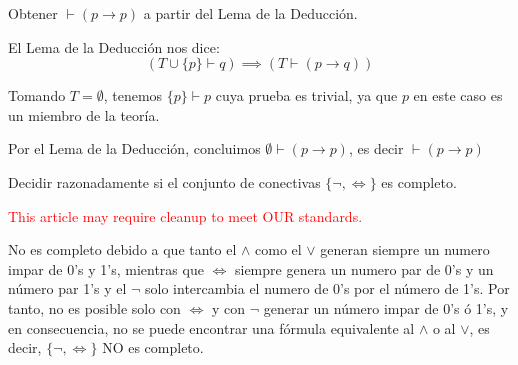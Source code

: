 \begin{problem}[9]
Obtener $\vdash (p\to p)$ a partir del Lema de la Deducci\'on.
\solution


El Lema de la Deducción nos dice: \[(T \cup \{p\} \vdash q) \implies (T\vdash (p\to q))\]

Tomando $T=\emptyset$, tenemos $\{p\} \vdash p$ cuya prueba es trivial, ya que $p$ en este caso es un miembro de la teoría.

Por el Lema de la Deducción, concluimos $\emptyset \vdash (p\to p)$, es decir $\vdash (p\to p)$


\end{problem}

\begin{problem}[10]
Decidir razonadamente si el conjunto de conectivas $\{¬,\iff\}$ es completo.
\label{ejer::H3P10}
\solution

\textcolor{red}{This article may require cleanup to meet OUR standards.}

No es completo debido a que tanto el $\land$ como el $\lor$ generan siempre un numero impar de 0's y 1's, mientras que $\iff$ siempre genera un numero par de 0's y un número par 1's y el $\neg$ solo intercambia el numero de 0's por el número de 1's. Por tanto, no es posible solo con $\iff$ y con $\neg$ generar un número impar de 0's ó 1's, y en consecuencia, no se puede encontrar una fórmula equivalente al $\land$ o al $\lor$, es decir, $\{\neg,\iff\}$ NO es completo.

\end{problem}
